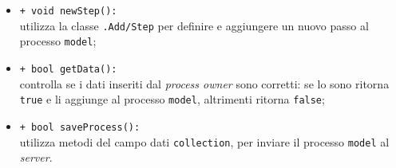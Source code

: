 \begin{flushleft}
\begin{itemize}
\begin{sloppypar}
\begin{itemize}
\item \texttt{+ void newStep():}\\ utilizza la classe \texttt{\logicAdmin{}.Add\fshyp{}Step} per definire e aggiungere un nuovo passo al processo \texttt{model};
\item \texttt{+ bool getData():}\\ controlla se i dati inseriti dal \textit{process owner} sono corretti: se lo sono ritorna \texttt{true} e li aggiunge al processo \texttt{model}, altrimenti ritorna \texttt{false};
\item \texttt{+ bool saveProcess():}\\ utilizza metodi del campo dati \texttt{collection}, per inviare il processo \texttt{model} al \textit{server}.
\end{itemize}
\end{sloppypar}
\end{itemize}
\end{flushleft}

